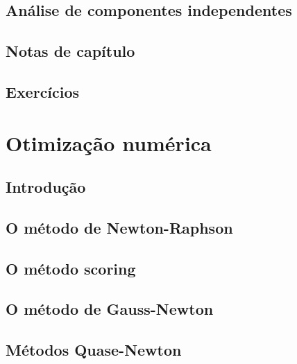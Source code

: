 \documentclass[
]{latex/krantz}
\theoremstyle{definition}
\theoremstyle{definition}
\theoremstyle{definition}
\theoremstyle{definition}
\theoremstyle{remark}
\begin{document}
\hypertarget{anuxe1lise-de-componentes-independentes}{%
\section{Análise de componentes independentes}\label{anuxe1lise-de-componentes-independentes}}

\hypertarget{notas-de-capuxedtulo-12}{%
\section{Notas de capítulo}\label{notas-de-capuxedtulo-12}}

\hypertarget{exercuxedcios-12}{%
\section{Exercícios}\label{exercuxedcios-12}}

\hypertarget{appendix-apuxeandices}{%
\appendix {}}


\hypertarget{otimizauxe7uxe3o-numuxe9rica}{%
\chapter{Otimização numérica}\label{otimizauxe7uxe3o-numuxe9rica}}

\hypertarget{introduuxe7uxe3o-13}{%
\section{Introdução}\label{introduuxe7uxe3o-13}}

\hypertarget{o-muxe9todo-de-newton-raphson}{%
\section{O método de Newton-Raphson}\label{o-muxe9todo-de-newton-raphson}}

\hypertarget{o-muxe9todo-scoring}{%
\section{O método scoring}\label{o-muxe9todo-scoring}}

\hypertarget{o-muxe9todo-de-gauss-newton}{%
\section{O método de Gauss-Newton}\label{o-muxe9todo-de-gauss-newton}}

\hypertarget{muxe9todos-quase-newton}{%
\section{Métodos Quase-Newton}\label{muxe9todos-quase-newton}}
\end{document}
